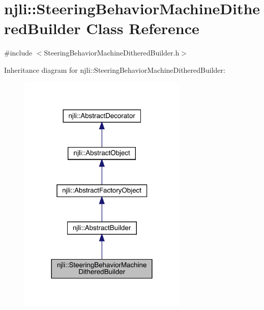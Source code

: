 \hypertarget{classnjli_1_1_steering_behavior_machine_dithered_builder}{}\section{njli\+:\+:Steering\+Behavior\+Machine\+Dithered\+Builder Class Reference}
\label{classnjli_1_1_steering_behavior_machine_dithered_builder}


{\ttfamily \#include $<$Steering\+Behavior\+Machine\+Dithered\+Builder.\+h$>$}



Inheritance diagram for njli\+:\+:Steering\+Behavior\+Machine\+Dithered\+Builder\+:\nopagebreak
\begin{figure}[H]
\begin{center}
\leavevmode
\includegraphics[width=228pt]{classnjli_1_1_steering_behavior_machine_dithered_builder__inherit__graph}
\end{center}
\end{figure}


